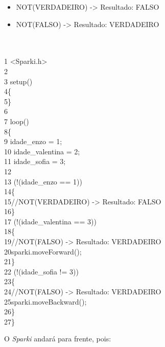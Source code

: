 \documentclass[conference]{IEEEtran}
\begin{document}
\begin{itemize}
    \item NOT(VERDADEIRO) -> Resultado: FALSO
    \item NOT(FALSO) -> Resultado: VERDADEIRO
\end{itemize}
\\
\\
{\selectfont
    {\color{cinza}1} <Sparki.h>\\
    {\color{cinza}2}\\
    {\color{cinza}3} setup()\\
    {\color{cinza}4}\quad\{\\
    {\color{cinza}5}\quad\}\\
    {\color{cinza}6}\\
    {\color{cinza}7} loop()\\
    {\color{cinza}8}\quad\{\\
    {\color{cinza}9}\quad{} idade\_enzo = 1;\\
    {\color{cinza}10}\quad{} idade\_valentina = 2;\\
    {\color{cinza}11}\quad{} idade\_sofia = 3;\\
    {\color{cinza}12}\\
    {\color{cinza}13}\quad{} ({\color{verde}!}(idade\_enzo == 1))\\
    {\color{cinza}14}\quad\quad \{\\
    {\color{cinza}15}\quad\quad\quad //NOT(VERDADEIRO) -> Resultado: FALSO\\
    {\color{cinza}16}\quad\quad \}\\
    {\color{cinza}17}\quad{} ({\color{verde}!}(idade\_valentina == 3))\\
    {\color{cinza}18}\quad\quad \{\\
    {\color{cinza}19}\quad\quad\quad //NOT(FALSO) -> Resultado: VERDADEIRO\\
    {\color{cinza}20}\quad\quad\quad sparki.moveForward();\\
    {\color{cinza}21}\quad\quad \}\\
    {\color{cinza}22}\quad{} ({\color{verde}!}(idade\_sofia != 3))\\
    {\color{cinza}23}\quad\quad \{\\
    {\color{cinza}24}\quad\quad\quad //NOT(FALSO) -> Resultado: VERDADEIRO\\
    {\color{cinza}25}\quad\quad\quad sparki.moveBackward();\\
    {\color{cinza}26}\quad\quad \}\\
    {\color{cinza}27}\quad\}}
\\
\par
O \textit{Sparki} andará para frente, pois:
\end{document}
